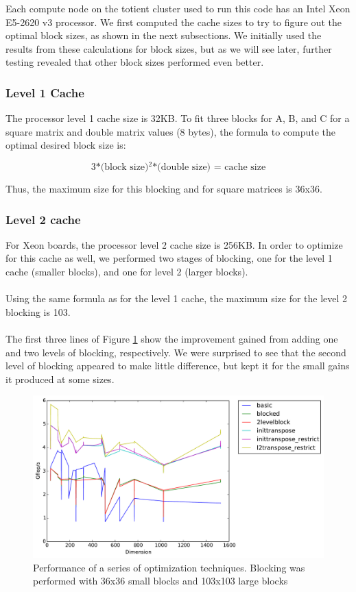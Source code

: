 \documentclass[letterpaper]{article}	 %
\begin{document}
\noindent Each compute node on the totient cluster used to run this code has an Intel Xeon E5-2620 v3 processor. We first computed the cache sizes to try to figure out the optimal block sizes, as shown in the next subsections. We initially used the results from these calculations for block sizes, but as we will see later, further testing revealed that other block sizes performed even better. 


\subsubsection{Level 1 Cache}
The processor level 1 cache size is 32KB. To fit three blocks for A, B, and C for a square matrix and double matrix values (8 bytes), the formula to compute the optimal desired block size is:

\begin{equation}
\text{3*(block size)$^2$*(double size) = cache size}
\end{equation}

\noindent Thus, the maximum size for this blocking and for square matrices is 36x36.

\subsubsection{Level 2 cache}
For Xeon boards, the processor level 2 cache size is 256KB. In order to optimize for this cache as well, we performed two stages of blocking, one for the level 1 cache (smaller blocks), and one for level 2 (larger blocks). \\ \\

Using the same formula as for the level 1 cache, the maximum size for the level 2 blocking is 103. \\ \\

The first three lines of Figure \ref{fig:progression} show the improvement gained from adding one and two levels of blocking, respectively. We were surprised to see that the second level of blocking appeared to make little difference, but kept it for the small gains it produced at some sizes. 

\begin{figure}[H]
	\centering
	\includegraphics[width=.6\linewidth]{timing-progression.pdf}
	\caption{Performance of a series of optimization techniques. Blocking was performed with 36x36 small blocks and 103x103 large blocks}
	\label{fig:progression}
\end{figure}
\end{document}
